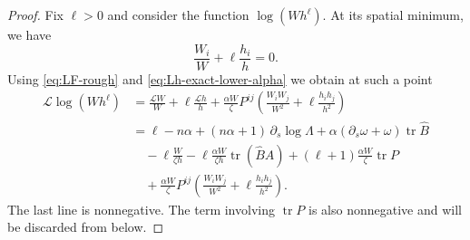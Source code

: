 \documentclass[10pt,a4paper]{amsart}
\DeclareMathOperator{\tr}{tr}
\begin{document}
\begin{proof}
Fix $\ell>0$ and consider the function $\log(Wh^\ell)$. At its spatial minimum,  we have
\begin{equation}\label{eq:min-condition-Fh-alpha}
        \frac{W_i}{W}+\ell\frac{h_i}{h}=0 .
\end{equation}
Using \eqref{eq:LF-rough} and \eqref{eq:Lh-exact-lower-alpha} we obtain at such a point
\begin{align}
       \mathcal L\log(Wh^\ell)
        &=
        \frac{\mathcal L W}{W}
        +\ell\frac{\mathcal L h}{h}
        +\frac{\alpha W}{\zeta}P^{ij}
          \left(
             \frac{W_iW_j}{W^2}
             +\ell\frac{h_i h_j}{h^2}
          \right)                        \nonumber              \\
        &=
        \ell-n\alpha
        +(n\alpha+1)\,\partial_s\log \Lambda
        +\alpha(\partial_s\omega+\omega)\tr\widehat B    \nonumber   \\
        &\quad
        -\ell\frac{W}{\zeta h}
        -\ell\frac{\alpha W}{\zeta h}\tr(\widehat B A)
        +(\ell+1)\frac{\alpha W}{\zeta}\tr P        \nonumber      \\
        &\quad
        +\frac{\alpha W}{\zeta}P^{ij}
          \left(
             \frac{W_iW_j}{W^2}
             +\ell\frac{h_i h_j}{h^2}
          \right).           \label{eq:LlogFh-exact-alpha}
\end{align}
The last line is nonnegative.  The term involving $\tr P$ is also
nonnegative and will be discarded from below.


\end{proof}
\end{document}
